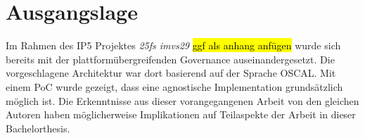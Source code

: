 \section{Ausgangslage}

Im Rahmen des IP5 Projektes \textit{25fs imvs29} \hl{ggf als anhang anfügen} wurde sich bereits mit der plattformübergreifenden Governance auseinandergesetzt. Die vorgeschlagene Architektur war dort basierend auf der Sprache OSCAL. Mit einem PoC wurde gezeigt, dass eine agnostische Implementation grundsätzlich möglich ist. Die Erkenntnisse aus dieser vorangegangenen Arbeit von den gleichen Autoren haben möglicherweise Implikationen auf Teilaspekte der Arbeit in dieser Bachelorthesis.